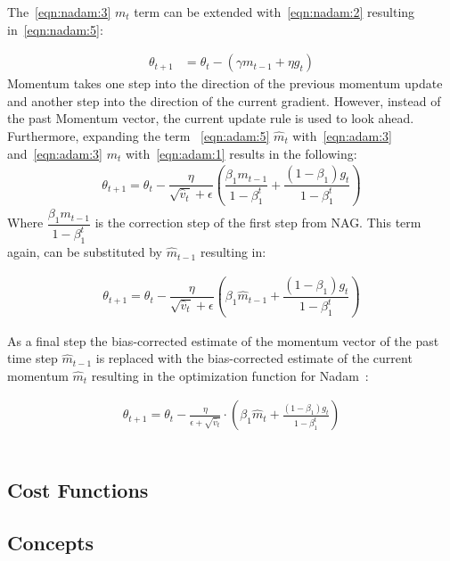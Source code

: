 The~\ref{eqn:nadam:3} $m_t$ term can be extended with~\ref{eqn:nadam:2} resulting in~\ref{eqn:nadam:5}:

\begin{align}
\theta_{t+1} &= \theta_t - (\gamma m_{t-1} + \eta g_t) \label{eqn:nadam:5}
\end{align}
Momentum takes one step into the direction of the previous momentum update and another step into the direction of the current
gradient.
However, instead of the past Momentum vector, the current update rule is used to look ahead.
Furthermore, expanding the term ~\ref{eqn:adam:5} $\hat{m}_t$ with~\ref{eqn:adam:3} and~\ref{eqn:adam:3} $m_t$ with~\ref{eqn:adam:1}
results in the following:
\begin{align}
 \theta_{t+1} = \theta_{t} - \dfrac{\eta}{\sqrt{\hat{v}_t} + \epsilon} (\dfrac{\beta_1 m_{t-1}}{1 - \beta^t_1} + \dfrac{(1 - \beta_1) g_t}{1 - \beta^t_1})
 \label{eqn:nadam:6}
\end{align}
Where $\dfrac{\beta_1 m_{t-1}}{1 - \beta^t_1}$ is the correction step of the first step from NAG.
This term again, can be substituted by $\hat{m}_{t-1}$ resulting in:

\begin{align}
    \theta_{t+1} = \theta_{t} - \dfrac{\eta}{\sqrt{\hat{v}_t} + \epsilon} (\beta_1 \hat{m}_{t-1} + \dfrac{(1 - \beta_1) g_t}{1 - \beta^t_1})
    \label{eqn:nadam:7}
\end{align}

As a final step the bias-corrected estimate of the momentum vector of the past time step $\hat{m}_{t-1}$ is replaced
with the bias-corrected estimate of the current momentum $\hat{m}_{t}$ resulting in the optimization function for Nadam~\cite{optimizersoverview}:



\begin{align}
    \theta_{t+1} = \theta_{t} - \frac{\eta}{\epsilon+\sqrt{\hat{v}_t}} \cdot (\beta_1\hat{m}_t+\frac{(1-\beta_1)g_t}{1-\beta_1^t}) \label{eqn:nadam:8}
\end{align}
\\ \par

\subsection{Cost Functions}
\label{cost}

\subsection{Concepts}


